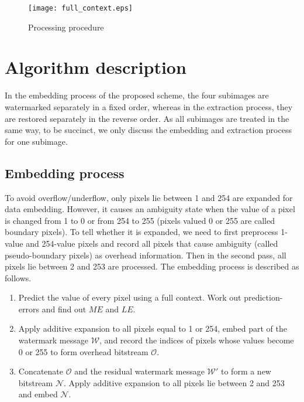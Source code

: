 \documentclass{article}
\begin{document}
\begin{figure}[t]
    \centering
    \texttt{[image: full\_context.eps]}
    \caption{\label{fig:pass}Processing procedure}
\end{figure}

\section{Algorithm description} \label{sec:algo}
In the embedding process of the proposed scheme, the four subimages are watermarked separately in a
fixed order, whereas in the extraction process, they are restored separately in the reverse order.
As all subimages are treated in the same way, to be succinct, we only discuss the embedding and
extraction process for one subimage. 
\subsection{Embedding process} \label{sec:embed}
To avoid overflow/underflow, only pixels lie between 1 and 254 are expanded for data embedding.
However, it causes an ambiguity state when the value of a pixel is changed from 1 to 0 or from 254
to 255 (pixels valued 0 or 255 are called boundary pixels). To tell whether it is expanded, we need
to first preprocess 1-value and 254-value pixels and record all pixels that cause ambiguity (called
pseudo-boundary pixels) as overhead information. Then in the second pass, all pixels lie between 2
and 253 are processed. The embedding process is described as follows.
\begin{enumerate}
  \item Predict the value of every pixel using a full context. Work out prediction-errors and find
      out $\mathit{ME}$ and $\mathit{LE}$.
  \item Apply additive expansion to all pixels equal to 1 or 254, embed part of the watermark
      message $\mathcal{W}$, and record the indices of pixels whose values become 0 or 255 to form
      overhead bitstream $\mathcal{O}$. 
  \item Concatenate $\mathcal{O}$ and the residual watermark message $\mathcal{W}'$ to form a new
      bitstream $\mathcal{N}$. Apply additive expansion to all pixels lie between 2 and 253 and
      embed $\mathcal{N}$.
\end{enumerate}
\end{document}
